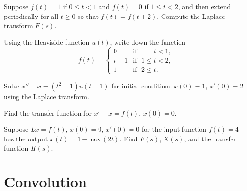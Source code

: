 \begin{exercise}
Suppose $f(t) = 1$ if $0 \leq t < 1$ and $f(t)=0$ if $1 \leq t < 2$, and
then extend periodically for all $t \geq 0$ so that $f(t)=f(t+2)$.  Compute the
Laplace transform $F(s)$.
\end{exercise}

\setcounter{exercise}{100}

\begin{exercise}
Using the Heaviside function $u(t)$, write down the function
\begin{equation*}
f(t) =
\begin{cases}
0 & \text{if } \; \phantom{1 \leq {}} t < 1  , \\
t-1 & \text{if } \; 1 \leq t < 2 , \\
1 & \text{if } \; 2 \leq t .
\end{cases}
\end{equation*}
\end{exercise}

\begin{exercise}
Solve $x''-x = (t^2-1) u(t-1)$ for initial conditions $x(0)=1$, $x'(0) = 2$
using the Laplace transform.
\end{exercise}
 
\begin{exercise}
Find the transfer function for 
$x' + x = f(t)$,
$x(0)=0$.
\end{exercise}

\begin{exercise}
Suppose $Lx = f(t)$, $x(0)=0$, $x'(0)=0$
for the input function $f(t) = 4$ has the output
$x(t) = 1 - \cos(2 t)$.  Find $F(s)$, $X(s)$, and the transfer function
$H(s)$.
\end{exercise}


\sectionnewpage
\section{Convolution}
\label{convolution:section}


